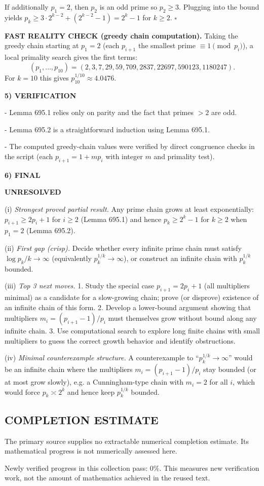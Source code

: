 If additionally $p_1=2$, then $p_2$ is an odd prime so $p_2\ge 3$. Plugging into the bound yields $p_k\ge 3\cdot 2^{k-2}+(2^{k-2}-1)=2^k-1$ for $k\ge 2$. \hfill$\square$

\medskip
\noindent\textbf{FAST REALITY CHECK (greedy chain computation).}
Taking the greedy chain starting at $p_1=2$ (each $p_{i+1}$ the smallest prime $\equiv 1\pmod{p_i}$), a local primality search gives the first terms:
\[
( p_1,\dots,p_{10})=(2,3,7,29,59,709,2837,22697,590123,1180247).
\]
For $k=10$ this gives $p_{10}^{1/10}\approx 4.0476$.

\bigskip
\noindent\textbf{5) VERIFICATION}

- Lemma 695.1 relies only on parity and the fact that primes $>2$ are odd.

- Lemma 695.2 is a straightforward induction using Lemma 695.1.

- The computed greedy-chain values were verified by direct congruence checks in the script (each $p_{i+1}=1+m p_i$ with integer $m$ and primality test).

\bigskip
\noindent\textbf{6) FINAL}

\textbf{UNRESOLVED}

(i) \emph{Strongest proved partial result.} Any prime chain grows at least exponentially: $p_{i+1}\ge 2p_i+1$ for $i\ge 2$ (Lemma 695.1) and hence $p_k\ge 2^k-1$ for $k\ge 2$ when $p_1=2$ (Lemma 695.2).

(ii) \emph{First gap (crisp).} Decide whether every infinite prime chain must satisfy $\log p_k/k\to\infty$ (equivalently $p_k^{1/k}\to\infty$), or construct an infinite chain with $p_k^{1/k}$ bounded.

(iii) \emph{Top 3 next moves.}
1. Study the special case $p_{i+1}=2p_i+1$ (all multipliers minimal) as a candidate for a slow-growing chain; prove (or disprove) existence of an infinite chain of this form.
2. Develop a lower-bound argument showing that multipliers $m_i=(p_{i+1}-1)/p_i$ must themselves grow without bound along any infinite chain.
3. Use computational search to explore long finite chains with small multipliers to guess the correct growth behavior and identify obstructions.

(iv) \emph{Minimal counterexample structure.} A counterexample to “$p_k^{1/k}\to\infty$” would be an infinite chain where the multipliers $m_i=(p_{i+1}-1)/p_i$ stay bounded (or at most grow slowly), e.g. a Cunningham-type chain with $m_i=2$ for all $i$, which would force $p_k\asymp 2^k$ and hence keep $p_k^{1/k}$ bounded.



\subsection*{COMPLETION ESTIMATE}
The primary source supplies no extractable numerical completion estimate. Its mathematical progress is not numerically assessed here.

Newly verified progress in this collection pass: $0\%$. This measures new verification work, not the amount of mathematics achieved in the reused text.
